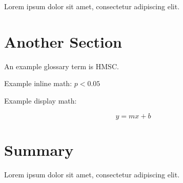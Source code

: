 
Lorem ipsum dolor sit amet, consectetur adipiscing elit.

\section{Another Section}

An example glossary term is \gls{HMSC}.


Example inline math: $p < 0.05$


Example display math:

\[
y = mx + b
\]


\section{Summary}

Lorem ipsum dolor sit amet, consectetur adipiscing elit.